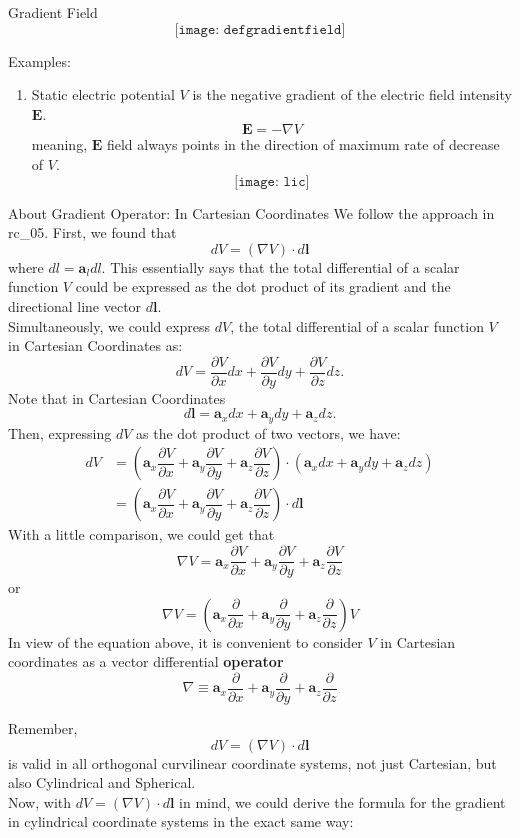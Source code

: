 \documentclass[10pt]{beamer}
\begin{document}
\begin{frame}[allowframebreaks]{Gradient Field}
	$$\texttt{[image: defgradientfield]}$$

Examples:
\begin{enumerate}
	\item Static electric potential $V$ is the negative gradient of the electric field intensity $\mathbf{E}$.
	$$\mathbf{E} = -\nabla V$$
	meaning, $\mathbf{E}$ field always points in the direction of maximum rate of decrease of $V$.
	$$\texttt{[image: lic]}$$
		
\end{enumerate}
\end{frame}

\begin{frame}[allowframebreaks]{About Gradient Operator: In Cartesian Coordinates}
We follow the approach in rc\_05. 
First, we found that $$dV = (\nabla V)\cdot d\mathbf{l}$$
where $dl = \mathbf{a}_ldl$. This essentially says that {\color{blue} the total differential of a scalar function $V$ could be expressed as the dot product of its gradient and the directional line vector $d\mathbf{l}$}.\\
Simultaneously, we could express $dV$, the total differential of a scalar function $V$ {\color{red} in Cartesian Coordinates} as:
$$dV = \dfrac{\partial V}{\partial x}dx + \dfrac{\partial V}{\partial y}dy + \dfrac{\partial V}{\partial z}dz.$$
Note that {\color{red} in Cartesian Coordinates}  $$d\mathbf{l} = \mathbf{a}_xdx + \mathbf{a}_ydy + \mathbf{a}_zdz.$$
Then, expressing $dV$ as the dot product of two vectors, we have:
\begin{align*}
dV &=  \left(\mathbf{a}_x\dfrac{\partial V}{\partial x} + \mathbf{a}_y\dfrac{\partial V}{\partial y} + \mathbf{a}_z\dfrac{\partial V}{\partial z}\right)  \cdot\left(\mathbf{a}_xdx + \mathbf{a}_ydy + \mathbf{a}_zdz\right)
\\&=\left(\mathbf{a}_x\dfrac{\partial V}{\partial x} + \mathbf{a}_y\dfrac{\partial V}{\partial y} + \mathbf{a}_z\dfrac{\partial V}{\partial z}\right) \cdot d\mathbf{l}
\end{align*}
With a little comparison, we could get that 
$$\nabla V = \mathbf{a}_x\dfrac{\partial V}{\partial x} + \mathbf{a}_y\dfrac{\partial V}{\partial y} + \mathbf{a}_z\dfrac{\partial V}{\partial z}$$
or
$$\nabla V = \left(\mathbf{a}_x\dfrac{\partial }{\partial x} + \mathbf{a}_y\dfrac{\partial }{\partial y} + \mathbf{a}_z\dfrac{\partial }{\partial z}\right) V$$
In view of the equation above, it is convenient to consider $V$ in Cartesian coordinates as a
vector differential {\bfseries\color{red}operator}
$$\nabla \equiv \mathbf{a}_x\dfrac{\partial }{\partial x} + \mathbf{a}_y\dfrac{\partial }{\partial y} + \mathbf{a}_z\dfrac{\partial }{\partial z}$$
	$$$$
	
	Remember, 
	$$dV = (\nabla V)\cdot d\mathbf{l}$$
	is valid in all orthogonal curvilinear coordinate systems, {\color{red} not just Cartesian, but also Cylindrical and Spherical}.
\\	Now, with $dV = (\nabla V)\cdot d\mathbf{l}$ in mind, we could derive the formula for the gradient in cylindrical coordinate systems in the exact same way:
\end{frame}
\end{document}
